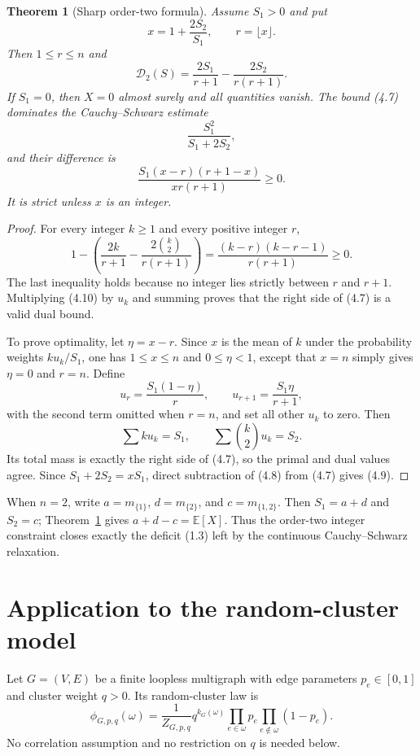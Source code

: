 \documentclass[11pt]{article}
\newtheorem{theorem}{Theorem}[section]
\theoremstyle{definition}
\theoremstyle{remark}
\newcommand{\E}{\mathbb E}
\newcommand{\cD}{\mathcal D}
\newcommand{\RC}{\phi}
\begin{document}
\begin{theorem}[Sharp order-two formula]\label{thm:DS}
Assume $S_1>0$ and put
\[
 x=1+\frac{2S_2}{S_1},\qquad r=\lfloor x\rfloor.
 \tag{4.6}
\]
Then $1\leq r\leq n$ and
\[
 \boxed{
 \cD_2(S)=
 \frac{2S_1}{r+1}-\frac{2S_2}{r(r+1)}.}
 \tag{4.7}
\]
If $S_1=0$, then $X=0$ almost surely and all quantities vanish.  The bound
(4.7) dominates the Cauchy--Schwarz estimate
\[
 \frac{S_1^2}{S_1+2S_2},
 \tag{4.8}
\]
and their difference is
\[
 \boxed{
 \frac{S_1(x-r)(r+1-x)}{xr(r+1)}\geq0.}
 \tag{4.9}
\]
It is strict unless $x$ is an integer.
\end{theorem}

\begin{proof}
For every integer $k\geq1$ and every positive integer $r$,
\[
 1-\left(\frac{2k}{r+1}
 -\frac{2\binom{k}{2}}{r(r+1)}\right)
 =\frac{(k-r)(k-r-1)}{r(r+1)}\geq0.
 \tag{4.10}
\]
The last inequality holds because no integer lies strictly between $r$ and
$r+1$.  Multiplying (4.10) by $u_k$ and summing proves that the right side
of (4.7) is a valid dual bound.

To prove optimality, let $\eta=x-r$.  Since $x$ is the mean of $k$ under
the probability weights $ku_k/S_1$, one has $1\leq x\leq n$ and
$0\leq\eta<1$, except that $x=n$ simply gives $\eta=0$ and $r=n$.
Define
\[
 u_r=\frac{S_1(1-\eta)}r,
 \qquad
 u_{r+1}=\frac{S_1\eta}{r+1},
 \tag{4.11}
\]
with the second term omitted when $r=n$, and set all other $u_k$ to zero.
Then
\[
 \sum k u_k=S_1,
 \qquad
 \sum\binom{k}{2}u_k=S_2.
\]
Its total mass is exactly the right side of (4.7), so the primal and dual
values agree.  Since $S_1+2S_2=xS_1$, direct subtraction of (4.8) from
(4.7) gives (4.9).
\end{proof}

When $n=2$, write $a=m_{\{1\}}$, $d=m_{\{2\}}$, and
$c=m_{\{1,2\}}$.  Then $S_1=a+d$ and $S_2=c$; Theorem~\ref{thm:DS}
gives $a+d-c=\E[X]$.  Thus the order-two integer constraint closes exactly
the deficit (1.3) left by the continuous Cauchy--Schwarz relaxation.

\section{Application to the random-cluster model}

Let $G=(V,E)$ be a finite loopless multigraph with edge parameters
$p_e\in[0,1]$ and cluster weight $q>0$.  Its random-cluster law is
\[
 \RC_{G,p,q}(\omega)=\frac1{Z_{G,p,q}}
 q^{k_G(\omega)}
 \prod_{e\in\omega}p_e
 \prod_{e\notin\omega}(1-p_e).
 \tag{5.1}
\]
No correlation assumption and no restriction on $q$ is needed below.
\end{document}
